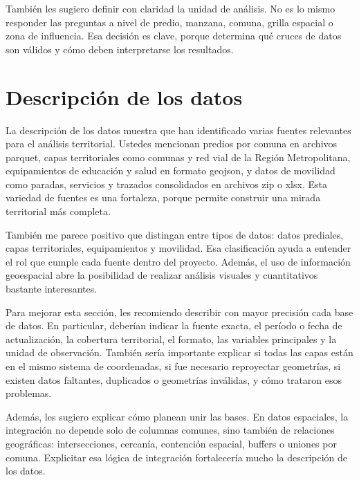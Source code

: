 \documentclass[11pt]{article}
\begin{document}
También les sugiero definir con claridad la unidad de análisis. No es lo mismo responder las preguntas a nivel de predio, manzana, comuna, grilla espacial o zona de influencia. Esa decisión es clave, porque determina qué cruces de datos son válidos y cómo deben interpretarse los resultados.

\vspace{0.5cm}

\section{Descripción de los datos}

La descripción de los datos muestra que han identificado varias fuentes relevantes para el análisis territorial. Ustedes mencionan predios por comuna en archivos parquet, capas territoriales como comunas y red vial de la Región Metropolitana, equipamientos de educación y salud en formato geojson, y datos de movilidad como paradas, servicios y trazados consolidados en archivos zip o xlsx. Esta variedad de fuentes es una fortaleza, porque permite construir una mirada territorial más completa.

También me parece positivo que distingan entre tipos de datos: datos prediales, capas territoriales, equipamientos y movilidad. Esa clasificación ayuda a entender el rol que cumple cada fuente dentro del proyecto. Además, el uso de información geoespacial abre la posibilidad de realizar análisis visuales y cuantitativos bastante interesantes.

Para mejorar esta sección, les recomiendo describir con mayor precisión cada base de datos. En particular, deberían indicar la fuente exacta, el período o fecha de actualización, la cobertura territorial, el formato, las variables principales y la unidad de observación. También sería importante explicar si todas las capas están en el mismo sistema de coordenadas, si fue necesario reproyectar geometrías, si existen datos faltantes, duplicados o geometrías inválidas, y cómo trataron esos problemas.

Además, les sugiero explicar cómo planean unir las bases. En datos espaciales, la integración no depende solo de columnas comunes, sino también de relaciones geográficas: intersecciones, cercanía, contención espacial, buffers o uniones por comuna. Explicitar esa lógica de integración fortalecería mucho la descripción de los datos.

\newpage
\end{document}
